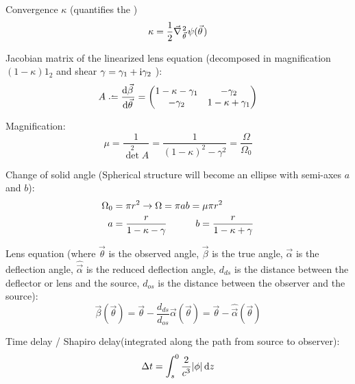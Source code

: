 			\noindent
			Convergence $\kappa$ (quantifies the )
			\begin{equation}
				\kappa = \frac{1}{2} \Nabla_{\vec{\theta}}^2 \psi(\vec{\theta})
			\end{equation}

			\noindent
			Jacobian matrix of the linearized lens equation (decomposed in magnification $(1-\kappa) 1_{2}$ and shear $\gamma =\gamma_1 + \mathrm{i} \gamma_2$ ):
			\begin{equation}
				A \defeq \dv{\vec{\beta}}{\vec{\theta}} = \mqty(
				1 - \kappa - \gamma_1 & -\gamma_2 \\
				-\gamma_2 & 1 - \kappa + \gamma_1)
			\end{equation}

			\noindent
			Magnification:
			\begin{equation}
				\mu  =\frac{1}{\det^2 A} = \frac{1}{(1-\kappa)^2 - \gamma^2} = \frac{\Omega}{\Omega_0}
			\end{equation}

			\noindent
			Change of solid angle (Spherical structure will become an ellipse with semi-axes $a$ and $b$):
			\begin{equation}
				\begin{aligned}
					\Omega_0 &= \pi r^2 \to \Omega = \pi a b = \mu \pi r^2 \\
					a &= \frac{r}{1-\kappa-\gamma} \hspace{30pt} b = \frac{r}{1-\kappa+\gamma}
				\end{aligned}
			\end{equation}

			\noindent
			Lens equation (where $\vec{\theta}$ is the observed angle, $\vec{\beta}$ is the true angle, $\vec{\alpha}$ is the deflection angle, $\hat{\vec{\alpha}}$ is the reduced deflection angle, $d_{ds}$ is the distance between the deflector or lens and the source, $d_{os}$ is the distance between the observer and the source):
			\begin{equation}
				\vec{\beta}(\vec{\theta})
				= \vec{\theta} - \frac{d_{ds}}{d_{os}} \vec{\alpha}(\vec{\theta})
				= \vec{\theta} - \hat{\vec{\alpha}}(\vec{\theta})
			\end{equation}

			\noindent
			Time delay / Shapiro delay(integrated along the path from source to observer):
			\begin{equation}
				\Delta t = \int_{s}^{0} \frac{2}{c^3} \abs{\phi} \dd{z}
			\end{equation}
